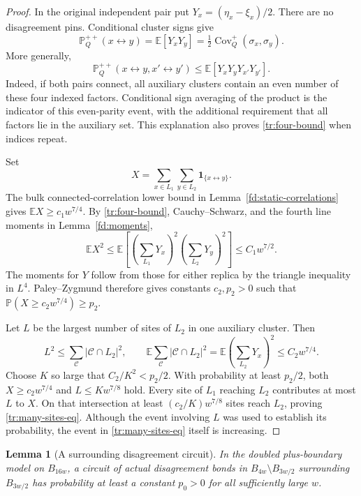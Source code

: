 \documentclass[11pt]{article}
\newtheorem{lemma}[theorem]{Lemma}
\theoremstyle{definition}
\theoremstyle{remark}
\numberwithin{equation}{section}
\begin{document}
\begin{proof}
In the original independent pair put $Y_x=(\eta_x-\xi_x)/2$. There are no
disagreement pins. Conditional cluster signs give
\begin{equation}
\label{tr:pair-identity}
 \mathbb P_Q^{++}(x\longleftrightarrow y)
 =\mathbb E[Y_xY_y]
 =\tfrac12\operatorname{Cov}_Q^+(\sigma_x,\sigma_y).
\end{equation}
More generally,
\begin{equation}
\label{tr:four-bound}
 \mathbb P_Q^{++}(x\longleftrightarrow y,
                  x'\longleftrightarrow y')
 \leq\mathbb E[Y_xY_yY_{x'}Y_{y'}].
\end{equation}
Indeed, if both pairs connect, all auxiliary clusters contain an even
number of these four indexed factors. Conditional sign averaging of the
product is the indicator of this even-parity event, with the additional
requirement that all factors lie in the auxiliary set. This explanation
also proves \eqref{tr:four-bound} when indices repeat.

Set
\[
 X=\sum_{x\in L_1}\sum_{y\in L_2}
        \mathbf1_{\{x\longleftrightarrow y\}}.
\]
The bulk connected-correlation lower bound in
Lemma~\ref{fd:static-correlations} gives $\mathbb EX\geq c_1w^{7/4}$.
By \eqref{tr:four-bound}, Cauchy--Schwarz, and the fourth line moments in
Lemma~\ref{fd:moments},
\[
 \mathbb EX^2
 \leq\mathbb E\left[
       \left(\sum_{L_1}Y_x\right)^2
       \left(\sum_{L_2}Y_y\right)^2\right]
 \leq C_1 w^{7/2}.
\]
The moments for $Y$ follow from those for either replica by the triangle
inequality in $L^4$. Paley--Zygmund therefore gives constants $c_2,p_2>0$
such that $\mathbb P(X\geq c_2w^{7/4})\geq p_2$.

Let $L$ be the largest number of sites of $L_2$ in one auxiliary cluster.
Then
\[
 L^2\leq\sum_{\mathcal C}|\mathcal C\cap L_2|^2,
 \qquad
 \mathbb E\sum_{\mathcal C}|\mathcal C\cap L_2|^2
 =\mathbb E\left(\sum_{L_2}Y_x\right)^2
 \leq C_2w^{7/4}.
\]
Choose $K$ so large that $C_2/K^2<p_2/2$. With probability at least
$p_2/2$, both $X\geq c_2w^{7/4}$ and $L\leq Kw^{7/8}$ hold. Every site
of $L_1$ reaching $L_2$ contributes at most $L$ to $X$. On that
intersection at least $(c_2/K)w^{7/8}$ sites reach $L_2$, proving
\eqref{tr:many-sites-eq}. Although the event involving $L$ was used to
establish its probability, the event in \eqref{tr:many-sites-eq} itself
is increasing.
\end{proof}

\begin{lemma}[A surrounding disagreement circuit]
\label{tr:circuit}
In the doubled plus-boundary model on $B_{16w}$, a circuit of actual
disagreement bonds in $B_{4w}\setminus B_{3w/2}$ surrounding $B_{3w/2}$ has
probability at least a constant $p_0>0$ for all sufficiently large $w$.
\end{lemma}
\end{document}
